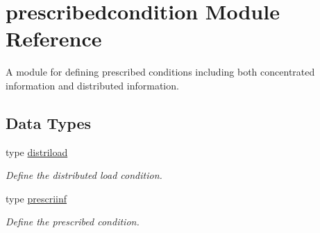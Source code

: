 \hypertarget{namespaceprescribedcondition}{}\section{prescribedcondition Module Reference}
\label{namespaceprescribedcondition}


A module for defining prescribed conditions including both concentrated information and distributed information.  


\subsection*{Data Types}
\begin{DoxyCompactItemize}
\item 
type \hyperlink{structprescribedcondition_1_1distriload}{distriload}
\begin{DoxyCompactList}\small\item\em Define the distributed load condition. \end{DoxyCompactList}\item 
type \hyperlink{structprescribedcondition_1_1prescriinf}{prescriinf}
\begin{DoxyCompactList}\small\item\em Define the prescribed condition. \end{DoxyCompactList}\end{DoxyCompactItemize}
